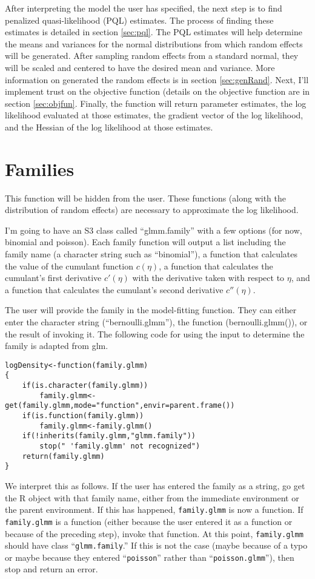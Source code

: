\documentclass{article}
\begin{document}
  After interpreting the model the user has specified, the next step is to find penalized quasi-likelihood (PQL) estimates.  The process of finding these estimates is detailed in section \ref{sec:pql}. The PQL estimates  will help determine the means and variances for the normal distributions from which random effects will be generated. After  sampling random effects from a standard normal, they will be scaled and centered to have the desired mean and variance. More information on generated the random effects is in section \ref{sec:genRand}. Next, I'll implement trust on the objective function (details on the objective function are in section \ref{sec:objfun}. Finally, the function will return parameter estimates, the log likelihood evaluated at those estimates, the gradient vector of the log likelihood, and the Hessian of the log likelihood at those estimates.


\section{Families} \label{sec:fam}
This function will be hidden from the user.  These functions (along with the distribution of random effects) are necessary to approximate the log likelihood.

I'm going to have an S3 class called ``glmm.family'' with a few options (for now, binomial and poisson). Each family  function will output a list including the family name (a character string such as ``binomial''), a function that calculates the value of the cumulant function $c(\eta)$,  a function that calculates the cumulant's first derivative $c'(\eta)$ with the derivative taken with respect to $\eta$, and  a function that calculates the cumulant's second derivative $c''(\eta)$. 

The user will provide the family in the model-fitting function. They can either enter the character string (``bernoulli.glmm''), the function (bernoulli.glmm()), or the result of invoking it.  The following code for using the input to determine the family is adapted from glm.

\begin{verbatim}
logDensity<-function(family.glmm)
{
	if(is.character(family.glmm))
		family.glmm<-get(family.glmm,mode="function",envir=parent.frame())
	if(is.function(family.glmm))
		family.glmm<-family.glmm()
	if(!inherits(family.glmm,"glmm.family")) 
		stop(" 'family.glmm' not recognized") 
	return(family.glmm)
}
\end{verbatim}
We interpret this as follows.  If the user has entered the family as a string, go get the R object with that family name, either from the immediate environment or the parent environment.  If this has happened, \texttt{family.glmm} is now a function.  If \texttt{family.glmm} is a function (either because the user entered it as a function or because of the preceding step), invoke that function.  At this point, \texttt{family.glmm} should have  class ``\texttt{glmm.family}.'' If this is not the case (maybe because of a typo or maybe because they entered ``\texttt{poisson}'' rather than ``\texttt{poisson.glmm}''), then stop and return an error.
\end{document}
